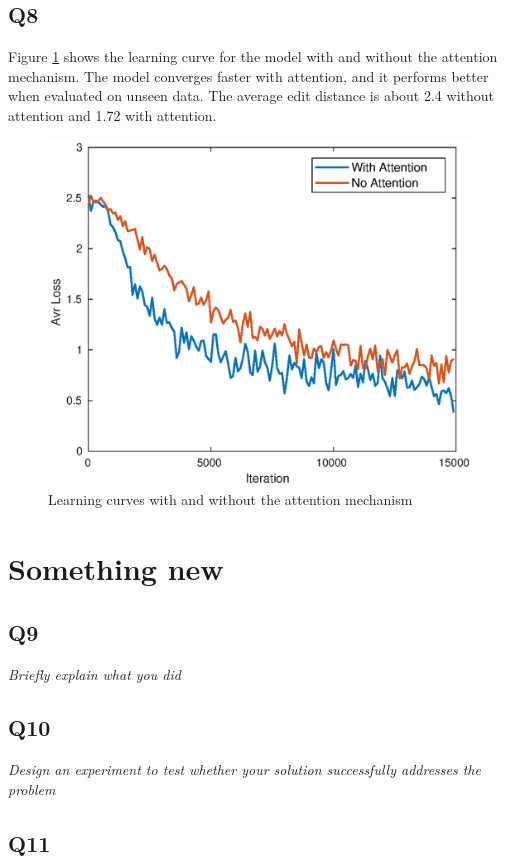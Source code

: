 \documentclass[12pt]{article}
\begin{document}
\subsection{Q8}

Figure \ref{fig_attention} shows the learning curve for the model with and without the attention mechanism. The model converges faster with attention, and it performs better when evaluated on unseen data. The average edit distance is about 2.4 without attention and 1.72 with attention.

\begin{figure}[h]
    \centering
    \includegraphics[width=\linewidth]{img/attention2.eps}
    \caption{Learning curves with and without the attention mechanism}
    \label{fig_attention}
\end{figure}



\section{Something new}

\subsection{Q9}
\textit{Briefly explain what you did}

\subsection{Q10}
\textit{Design an experiment to test whether your solution successfully addresses the problem}

\subsection{Q11}
\textit{}
\end{document}

